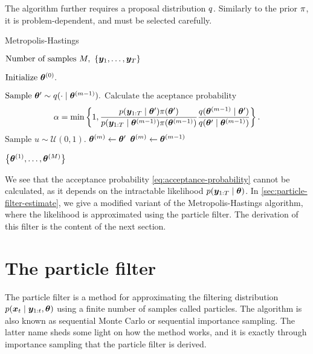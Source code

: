 The algorithm further requires a proposal distribution $q$. Similarly to the prior $\pi$, it is problem-dependent, and must be selected carefully.

\begin{algorithm}[ht]
    \caption{Metropolis-Hastings}
    \label{alg:metropolis-hastings}
    \begin{algorithmic}[1]
        \Input $\text{Number of samples } M,\ \left\{\by_1, \ldots, \by_T\right\}$
        
        \State $\text{Initialize } \bm{\theta}^{(0)}.$
        
            \State $\text{Sample } \bm{\theta}^\prime \sim q(\cdot \mid \bm{\theta}^{(m-1)}).$
            \State $\text{Calculate the aceptance probability } $ \begin{equation} \label{eq:acceptance-probability}
            \alpha = \min \left\{1, \frac{p(\bm{y}_{1:T} \mid \bm{\theta}^\prime) \pi(\bm{\theta}^\prime)}{p(\bm{y}_{1:T} \mid \bm{\theta}^{(m-1)}) \pi(\bm{\theta}^{(m-1)})} \frac{q(\bm{\theta}^{(m-1)} \mid \bm{\theta}^\prime)}{q(\bm{\theta}^\prime \mid \bm{\theta}^{(m-1)})} \right\}.
            \end{equation}
            \State $\text{Sample } u \sim \mathcal{U}(0,1).$
                \State $\bm{\theta}^{(m)} \gets \bm{\theta}^\prime$ 
            \Else
                \State $\bm{\theta}^{(m)} \gets \bm{\theta}^{(m-1)}$ 
            \EndIf
        \EndFor
        
        \Output $\left\{ \bm{\theta}^{(1)}, \ldots, \bm{\theta}^{(M)} \right\}$
    \end{algorithmic}
\end{algorithm}

We see that the acceptance probability \eqref{eq:acceptance-probability} cannot be calculated, as it depends on the intractable likelihood $p(\bm{y}_{1:T} \mid \bm{\theta})$. In \autoref{sec:particle-filter-estimate}, we give a modified variant of the Metropolis-Hastings algorithm, where the likelihood is approximated using the particle filter. The derivation of this filter is the content of the next section.



\section{The particle filter} \label{sec:particle-filter}
The particle filter \citep{particle-filter} is a method for approximating the filtering distribution $p(\bm{x}_t \mid \bm{y}_{1:t}, \bm{\theta})$ using a finite number of samples called particles. The algorithm is also known as sequential Monte Carlo or sequential importance sampling. The latter name sheds some light on how the method works, and it is exactly through importance sampling that the particle filter is derived.

